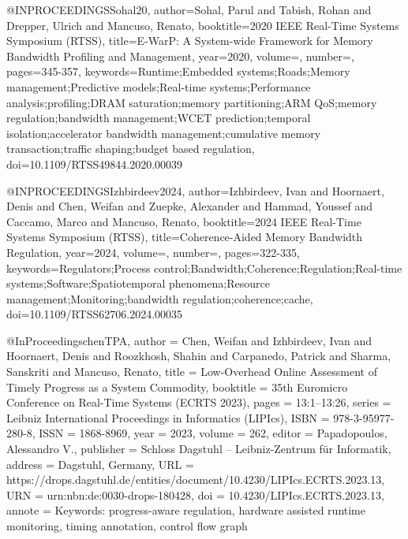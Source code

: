 {@INPROCEEDINGS{Sohal20,
  author={Sohal, Parul and Tabish, Rohan and Drepper, Ulrich and Mancuso, Renato},
  booktitle={2020 IEEE Real-Time Systems Symposium (RTSS)}, 
  title={E-WarP: A System-wide Framework for Memory Bandwidth Profiling and Management}, 
  year={2020},
  volume={},
  number={},
  pages={345-357},
  keywords={Runtime;Embedded systems;Roads;Memory management;Predictive models;Real-time systems;Performance analysis;profiling;DRAM saturation;memory partitioning;ARM QoS;memory regulation;bandwidth management;WCET prediction;temporal isolation;accelerator bandwidth management;cumulative memory transaction;traffic shaping;budget based regulation},
  doi={10.1109/RTSS49844.2020.00039}}

@INPROCEEDINGS{Izhbirdeev2024,
  author={Izhbirdeev, Ivan and Hoornaert, Denis and Chen, Weifan and Zuepke, Alexander and Hammad, Youssef and Caccamo, Marco and Mancuso, Renato},
  booktitle={2024 IEEE Real-Time Systems Symposium (RTSS)}, 
  title={Coherence-Aided Memory Bandwidth Regulation}, 
  year={2024},
  volume={},
  number={},
  pages={322-335},
  keywords={Regulators;Process control;Bandwidth;Coherence;Regulation;Real-time systems;Software;Spatiotemporal phenomena;Resource management;Monitoring;bandwidth regulation;coherence;cache},
  doi={10.1109/RTSS62706.2024.00035}}

@InProceedings{chenTPA,
  author =	{Chen, Weifan and Izhbirdeev, Ivan and Hoornaert, Denis and Roozkhosh, Shahin and Carpanedo, Patrick and Sharma, Sanskriti and Mancuso, Renato},
  title =	{{Low-Overhead Online Assessment of Timely Progress as a System Commodity}},
  booktitle =	{35th Euromicro Conference on Real-Time Systems (ECRTS 2023)},
  pages =	{13:1--13:26},
  series =	{Leibniz International Proceedings in Informatics (LIPIcs)},
  ISBN =	{978-3-95977-280-8},
  ISSN =	{1868-8969},
  year =	{2023},
  volume =	{262},
  editor =	{Papadopoulos, Alessandro V.},
  publisher =	{Schloss Dagstuhl -- Leibniz-Zentrum f{\"u}r Informatik},
  address =	{Dagstuhl, Germany},
  URL =		{https://drops.dagstuhl.de/entities/document/10.4230/LIPIcs.ECRTS.2023.13},
  URN =		{urn:nbn:de:0030-drops-180428},
  doi =		{10.4230/LIPIcs.ECRTS.2023.13},
  annote =	{Keywords: progress-aware regulation, hardware assisted runtime monitoring, timing annotation, control flow graph}
}


}
